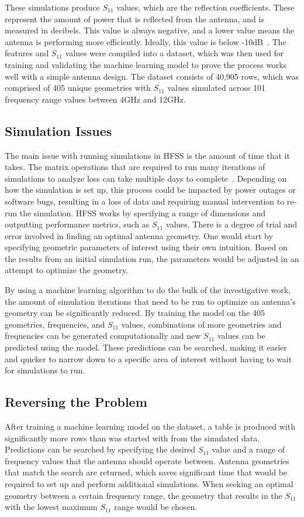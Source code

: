\documentclass[conference]{IEEEtran}
\begin{document}
These simulations produce $S_{11}$ values, which are the reflection coefficients. These represent the amount of power that is reflected from the antenna, and is measured in decibels. This value is always negative, and a lower value means the antenna is performing more efficiently. Ideally, this value is below -10dB~\cite{Bevelacqua_2015}. The features and $S_{11}$ values were compiled into a dataset, which was then used for training and validating the machine learning model to prove the process works well with a simple antenna design. The dataset consists of 40,905 rows, which was comprised of 405 unique geometries with $S_{11}$ values simulated across 101 frequency range values between 4GHz and 12GHz.

\subsection{Simulation Issues}
The main issue with running simulations in HFSS is the amount of time that it takes. The matrix operations that are required to run many iterations of simulations to analyze loss can take multiple days to complete~\cite{john_antenna_2009,liu_efficient_2014}. Depending on how the simulation is set up, this process could be impacted by power outages or software bugs, resulting in a loss of data and requiring manual intervention to re-run the simulation. HFSS works by specifying a range of dimensions and outputting performance metrics, such as $S_{11}$ values. There is a degree of trial and error involved in finding an optimal antenna geometry. One would start by specifying geometric parameters of interest using their own intuition. Based on the results from an initial simulation run, the parameters would be adjusted in an attempt to optimize the geometry.

By using a machine learning algorithm to do the bulk of the investigative work, the amount of simulation iterations that need to be run to optimize an antenna's geometry can be significantly reduced. By training the model on the 405 geometries, frequencies, and $S_{11}$ values, combinations of more geometries and frequencies can be generated computationally and new $S_{11}$ values can be predicted using the model. These predictions can be searched, making it easier and quicker to narrow down to a specific area of interest without having to wait for simulations to run.


\subsection{Reversing the Problem}
After training a machine learning model on the dataset, a table is produced with significantly more rows than was started with from the simulated data. Predictions can be searched by specifying the desired $S_{11}$ value and a range of frequency values that the antenna should operate between. Antenna geometries that match the search are returned, which saves significant time that would be required to set up and perform additional simulations. When seeking an optimal geometry between a certain frequency range, the geometry that results in the $S_{11}$ with the lowest maximum $S_{11}$ range would be chosen.
\end{document}
